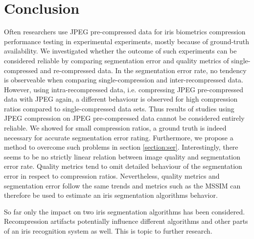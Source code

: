 \documentclass[10pt,twocolumn,letterpaper]{article}
\begin{document}
\section{Conclusion}
\label{section:conclusion}
Often researchers use JPEG pre-compressed data for iris biometrics compression performance testing in experimental experiments, mostly because of ground-truth availability. We investigated whether the outcome of such experiments can be considered reliable by comparing segmentation error and quality metrics of single-compressed and re-compressed data.  In the segmentation error rate, no tendency is observeable when comparing single-compression and inter-recompressed data. However, using intra-recompressed data, i.e. compressing JPEG pre-compressed data with JPEG again, a different behaviour is observed for high compression ratios compared to single-compressed data sets. Thus results of studies using JPEG compression on JPEG pre-compressed data cannot be considered entirely reliable. We showed for small compression ratios, a ground truth is indeed necessary for accurate segmentation error rating. Furthermore, we propose a method to overcome such problems in section \ref{section:ser}. Interestingly, there seems to be no strictly linear relation between image quality and segmentation error rate. Quality metrics tend to omit detailed behaviour of the segmentation error in respect to compression ratios. Nevertheless, quality metrics and segmentation error follow the same trends and metrics such as the MSSIM can therefore be used to estimate an iris segmentation algorithms behavior. 

So far only the impact on two iris segmentation algorithms has been considered. Recompression artifacts potentially influence different algorithms and other parts of an iris recognition system as well. This is topic to further research.           


{\small


}
\end{document}
